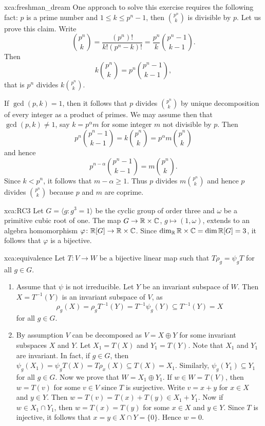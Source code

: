 \begin{sol}{xca:freshman_dream}
    One approach to solve this exercise requires the following fact: 
    $p$ is a prime number and $1\leq k\leq p^n-1$, then $\binom{p^n}{k}$ is divisible by $p$.
    Let us prove this claim. Write
    \[
    \binom{p^n}{k}=\frac{(p^n)!}{k!(p^n-k)!}=\frac{p^n}{k}\binom{p^n-1}{k-1}.
    \]
    Then
    \[
    k\binom{p^n}{k}=p^n\binom{p^n-1}{k-1},
    \]
    that is $p^n$ divides $k\binom{p^n}{k}$. 
    
    If $\gcd(p,k)=1$, then it follows that $p$ divides $\binom{p^n}{k}$ by unique decomposition
    of every integer as a product of primes. We may assume then that $\gcd(p,k)\ne1$, 
    say $k=p^\alpha m$ for some integer $m$ not divisible by $p$. Then
    \[
    p^n\binom{p^n-1}{k-1}=k\binom{p^n}{k}=p^{\alpha}m\binom{p^n}{k}
    \]
    and hence 
    \[
    p^{n-\alpha}\binom{p^n-1}{k-1}=m\binom{p^n}{k}.
    \]
    Since $k<p^n$, it follows that
    $m-\alpha\geq 1$. Thus $p$ divides $m\binom{p^n}{k}$ and hence
    $p$ divides $\binom{p^n}{k}$ because $p$ and $m$ are coprime. 
\end{sol}


\begin{sol}{xca:RC3}
Let $G=\langle g:g^3=1\rangle$ be the cyclic group of order three and $\omega$ be a primitive cubic root of one.  
The map $G\to \mathbb{R}\times\mathbb{C}$, $g\mapsto (1,\omega)$, extends to an algebra
homomorphism $\varphi\colon\mathbb{R}[G]\to\mathbb{R}\times\mathbb{C}$. Since 
$\dim_{\mathbb{R}}\mathbb{R}\times\mathbb{C}=\dim\mathbb{R}[G]=3$, it follows that $\varphi$ is a bijective. 
\end{sol}


\begin{sol}{xca:equivalence}
Let $T\colon V\to W$ be a bijective linear map such that $T\rho_g=\psi_gT$ for all $g\in G$. 
\begin{enumerate}
	\item Assume that $\psi$ is not irreducible. Let $Y$ be an invariant subspace of $W$. 
		Then $X=T^{-1}(Y)$ is an invariant subspace of $V$, as 
		\[
		\rho_g(X)=\rho_gT^{-1}(Y)=T^{-1}\psi_g(Y)\subseteq T^{-1}(Y)=X
		\]
		for all $g\in G$. 
	\item By assumption
		$V$ can be decomposed as $V=X\oplus Y$ for some invariant subspaces $X$ and $Y$. Let $X_1=T(X)$ 
		and $Y_1=T(Y)$. 
		Note that $X_1$ and $Y_1$ are invariant. In fact, if $g\in G$, then  
		$\psi_g(X_1)=\psi_g T(X)=T\rho_x(X)\subseteq T(X)=X_1$.
		Similarly, $\psi_g(Y_1)\subseteq Y_1$ 
		for all $g\in G$. Now we prove that $W=X_1\oplus Y_1$. If $w\in W=T(V)$, then 
		$w=T(v)$ for some $v\in V$ since $T$ is surjective. Write $v=x+y$ for $x\in X$ and $y\in Y$. Then 
		$w=T(v)=T(x)+T(y)\in X_1+Y_1$. Now if $w\in X_1\cap Y_1$, then $w=T(x)=T(y)$ for some $x\in X$ and
		$y\in Y$. Since $T$ is injective, it follows that $x=y\in X\cap Y=\{0\}$. Hence $w=0$. 
	\end{enumerate}	
\end{sol}

